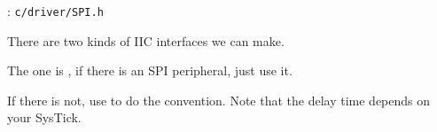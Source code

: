 
: \verb`c/driver/SPI.h`

There are two kinds of IIC interfaces we can make.

The one is , if there is an SPI peripheral, just use it.

If there is not, use  to do the convention.
Note that the delay time depends on your SysTick.
